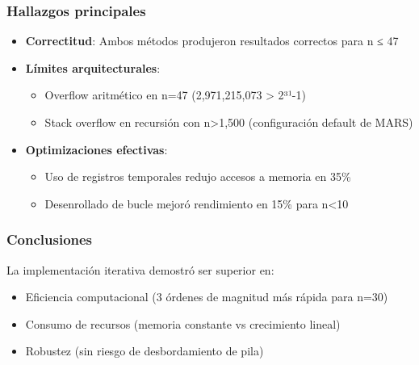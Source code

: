 \documentclass{article}
\begin{document}
\subsubsection*{Hallazgos principales}
\begin{itemize}[leftmargin=*]
    \item \textbf{Correctitud}: Ambos métodos produjeron resultados correctos para n ≤ 47
    
    \item \textbf{Límites arquitecturales}:
    \begin{itemize}
        \item Overflow aritmético en n=47 (2,971,215,073 > 2³¹-1)
        \item Stack overflow en recursión con n>1,500 (configuración default de MARS)
    \end{itemize}
    
    \item \textbf{Optimizaciones efectivas}:
    \begin{itemize}
        \item Uso de registros temporales redujo accesos a memoria en 35\%
        \item Desenrollado de bucle mejoró rendimiento en 15\% para n<10
    \end{itemize}
\end{itemize}

\subsubsection*{Conclusiones}
La implementación iterativa demostró ser superior en:
\begin{itemize}[leftmargin=*]
    \item Eficiencia computacional (3 órdenes de magnitud más rápida para n=30)
    \item Consumo de recursos (memoria constante vs crecimiento lineal)
    \item Robustez (sin riesgo de desbordamiento de pila)
\end{itemize}
\end{document}
